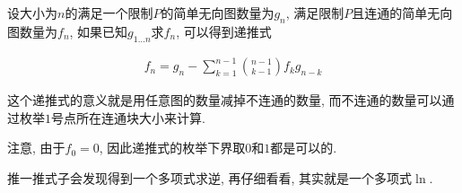 设大小为$n$的满足一个限制$P$的简单无向图数量为$g_n$, 满足限制$P$且连通的简单无向图数量为$f_n$, 如果已知$g_{1\dots n}$求$f_n$, 可以得到递推式

$$\begin{aligned}f_n=g_n-\sum_{k=1}^{n-1}{n-1\choose k-1}f_k g_{n-k}\end{aligned}$$

这个递推式的意义就是用任意图的数量减掉不连通的数量, 而不连通的数量可以通过枚举$1$号点所在连通块大小来计算.

注意, 由于$f_0=0$, 因此递推式的枚举下界取$0$和$1$都是可以的.

推一推式子会发现得到一个多项式求逆, 再仔细看看, 其实就是一个多项式$\ln$.